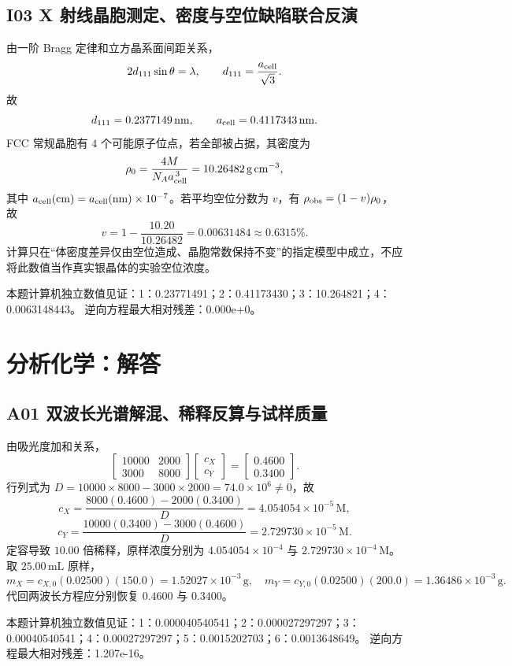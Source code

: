 \documentclass[UTF8,openany,11pt,a4paper]{ctexbook}
\begin{document}
\section{I03 \quad X 射线晶胞测定、密度与空位缺陷联合反演}
由一阶 Bragg 定律和立方晶系面间距关系，
\[
2d_{111}\sin\theta=\lambda,\qquad
d_{111}=\frac{a_{\rm cell}}{\sqrt3}.
\]
故
\[
d_{111}=0.2377149\,\mathrm{nm},\qquad
a_{\rm cell}=0.4117343\,\mathrm{nm}.
\]
FCC 常规晶胞有 \(4\) 个可能原子位点，若全部被占据，其密度为
\[
\rho_0=\frac{4M}{N_Aa_{\rm cell}^{\,3}}
       =10.26482\,\mathrm{g\,cm^{-3}},
\]
其中 \(a_{\rm cell}(\mathrm{cm})=a_{\rm cell}(\mathrm{nm})\times10^{-7}\)。若平均空位分数为 \(v\)，有 \(\rho_{\rm obs}=(1-v)\rho_0\)，故
\[
v=1-\frac{10.20}{10.26482}=0.00631484\approx0.6315\%.
\]
计算只在“体密度差异仅由空位造成、晶胞常数保持不变”的指定模型中成立，不应将此数值当作真实银晶体的实验空位浓度。
\begin{reviewnote}
本题计算机独立数值见证：1：0.23771491；2：0.41173430；3：10.264821；4：0.0063148443。
逆向方程最大相对残差：0.000e+0。
\end{reviewnote}
\chapter{分析化学：解答}
\section{A01 \quad 双波长光谱解混、稀释反算与试样质量}
由吸光度加和关系，
\[
\begin{bmatrix}10000&2000\\3000&8000\end{bmatrix}
\begin{bmatrix}c_X\\c_Y\end{bmatrix}
=\begin{bmatrix}0.4600\\0.3400\end{bmatrix}.
\]
行列式为 \(D=10000\times8000-3000\times2000=74.0\times10^6\neq0\)，故
\[
c_X=\frac{8000(0.4600)-2000(0.3400)}D
    =4.054054\times10^{-5}\,\mathrm M,
\]
\[
c_Y=\frac{10000(0.3400)-3000(0.4600)}D
    =2.729730\times10^{-5}\,\mathrm M.
\]
定容导致 \(10.00\) 倍稀释，原样浓度分别为 \(4.054054\times10^{-4}\) 与 \(2.729730\times10^{-4}\,\mathrm M\)。取 \(25.00\,\mathrm{mL}\) 原样，
\[
m_X=c_{X,0}(0.02500)(150.0)=1.52027\times10^{-3}\,\mathrm g,
\quad
m_Y=c_{Y,0}(0.02500)(200.0)=1.36486\times10^{-3}\,\mathrm g.
\]
代回两波长方程应分别恢复 \(0.4600\) 与 \(0.3400\)。
\begin{reviewnote}
本题计算机独立数值见证：1：0.000040540541；2：0.000027297297；3：0.00040540541；4：0.00027297297；5：0.0015202703；6：0.0013648649。
逆向方程最大相对残差：1.207e-16。
\end{reviewnote}
\end{document}
